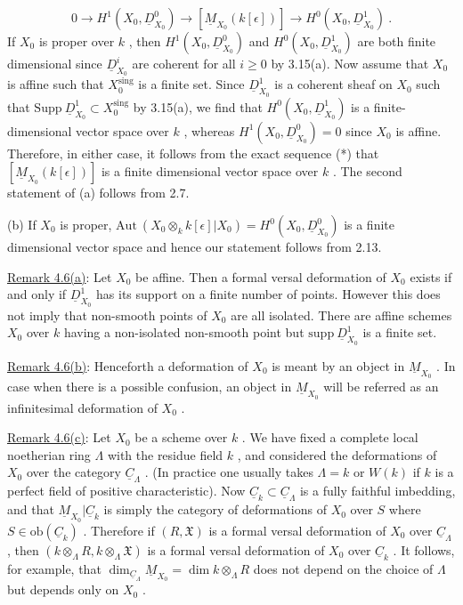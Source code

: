 \begin{equation}\tag{*}
0 \to H^{1}(X_{0}, \underline{D}^{0}_{X_{0}}) \to [\underline{M}_{X_{0}}(k[\epsilon])] \to H^{0}(X_{0}, \underline{D}^{1}_{X_{0}}) \ .
\end{equation}
If  $X_{0}$  is proper over  $k$  , then  $H^{1}(X_{0}, \underline{D}^{0}_{X_{0}})$  and  $H^{0}(X_{0}, \underline{D}^{1}_{X_{0}})$  are both finite dimensional since  $\underline{D}^{i}_{X_{0}}$  are coherent for all  $i \geq 0$  by 3.15(a). Now assume that $X_{0}$  is affine such that  $X_{0}^{\mathrm{sing}}$  is a finite set. Since  $\underline{D}^{1}_{X_{0}}$  is a coherent sheaf on  $X_{0}$  such that  $\mathrm{Supp}\ \underline{D}^{1}_{X_{0}} \subset X_{0}^{\mathrm{sing}}$  by 3.15(a), we find that  $H^{0}(X_{0}, \underline{D}^{1}_{X_{0}})$  is a finite-dimensional vector space over  $k$  , whereas  $H^{1}(X_{0}, \underline{D}^{0}_{X_{0}}) = 0$  since  $X_{0}$ is affine. Therefore, in either case, it follows from the exact sequence (*) that $[\underline{M}_{X_{0}}(k[\epsilon])]$  is a finite dimensional vector space over  $k$  . The second statement of (a) follows from 2.7.

          (b)  If  $X_{0}$  is proper,  $\mathrm{Aut}\ (X_{0} \otimes_{k} k[\epsilon]|X_{0}) = H^{0}(X_{0}, \underline{D}^{0}_{X_{0}})$  is a finite dimensional vector space and hence our statement follows from 2.13.

\underline{Remark 4.6(a)}:  Let  $X_{0}$  be affine. Then a formal versal deformation of  $X_{0}$ exists if and only if  $\underline{D}^{1}_{X_{0}}$  has its support on a finite number of points. However this does not imply that non-smooth points of  $X_{0}$  are all isolated. There are affine schemes  $X_{0}$  over $k$  having a non-isolated non-smooth point but  $\mathrm{supp}\ \underline{D}^{1}_{X_{0}}$ is a finite set.

\underline{Remark 4.6(b)}:  Henceforth a deformation of  $X_{0}$  is meant by an object in  $\underline{M}_{X_{0}}$  . In case when there is a possible confusion, an object in  $\underline{M}_{X_{0}}$  will be referred as an infinitesimal deformation of  $X_{0}$  .

\underline{Remark 4.6(c)}:  Let  $X_{0}$  be a scheme over  $k$  . We have fixed a complete local noetherian ring  $\Lambda$  with the residue field  $k$  , and considered the deformations
of  $X_{0}$  over the category  $\underline{C}_{\Lambda}$  . (In practice one usually takes  $\Lambda = k$  or  $W(k)$ if  $k$  is a perfect field of positive characteristic). Now  $\underline{C}_{k} \subset \underline{C}_{\Lambda}$  is a fully faithful imbedding, and that  $\underline{M}_{X_{0}}|\underline{C}_{k}$  is simply the category of deformations of $X_{0}$  over  $S$  where  $S \in \mathrm{ob}(\underline{C}_{k})$  . Therefore if  $(R, \mathfrak{X})$  is a formal versal deformation of  $X_{0}$  over  $\underline{C}_{\Lambda}$  , then  $(k \otimes_{\Lambda} R, k \otimes_{\Lambda} \mathfrak{X})$  is a formal versal deformation of $X_{0}$  over  $\underline{C}_{k}$  . It follows, for example, that  $\dim_{\underline{C}_{\Lambda}} \underline{M}_{X_{0}} = \dim k \otimes_{\Lambda} R$  does not depend on the choice of  $\Lambda$  but depends only on  $X_{0}$  .

